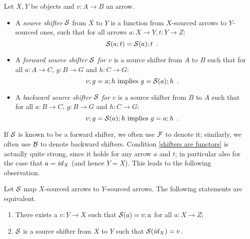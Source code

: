 \begin{definition}
Let $X,Y$ be objects and $v:A\to B$ an arrow.
\begin{itemize}[topsep=\smallskipamount]
\item A \emph{source shifter} $\mathcal{S}$ from $X$ to $Y$ is a function from $X$-sourced arrows to $Y$-sourced ones, such that for all arrows $a:X\to Y, t:Y\to Z$:
%
\begin{equation}\eqlabel{shifters are functors}
\cS(a;t) = \cS(a);t \enspace.
\end{equation}
%
\item A \emph{forward source shifter $\mathcal{S}$ for $v$} is a source shifter from $A$ to $B$ such that for all $a:A\to C$, $g:B\to G$ and $h:C\to G$:
%
\begin{equation}\eqlabel{forward condition}
v;g = a;h \text{ implies } g = \cS(a);h \enspace.
\end{equation}
%
\item A \emph{backward source shifter $\mathcal{S}$ for $v$} is a source shifter from $B$ to $A$ such that for all $a:B\to C$, $g:B\to G$ and $h:C\to G$:
%
\begin{equation}\eqlabel{backward condition}
v;g = \cS(a);h \text{ implies } g = a;h \enspace.
\end{equation}
\end{itemize}
\end{definition}
%
If $\mathcal{S}$ is known to be a forward shifter, we often use $\mathcal{F}$ to denote it; similarly, we often use $\mathcal{B}$ to denote backward shifters. Condition \eqref{shifters are functors} is actually quite strong, since it holds for any arrow $a$ and $t$; in particular also for the case that $a=\mathit{id}_X$ (and hence $Y=X$). This leads to the following observation.
%
\begin{lemma}
Let $\mathcal{S}$ map $X$-sourced arrows to $Y$-sourced arrows. The following statements are equivalent.
\begin{enumerate}[topsep=\smallskipamount,label=(\alph*),ref=(\alph{enumi})]
\item\label{shifter-1} There exists a $v:Y\to X$ such that $\mathcal{S}(a)=v;a$ for all $a:X\to Z$;
\item\label{shifter-2} $\mathcal{S}$ is a source shifter from $X$ to $Y$ such that $\mathcal{S}(\mathit{id}_X)=v$.
\end{enumerate}
\end{lemma}
%
